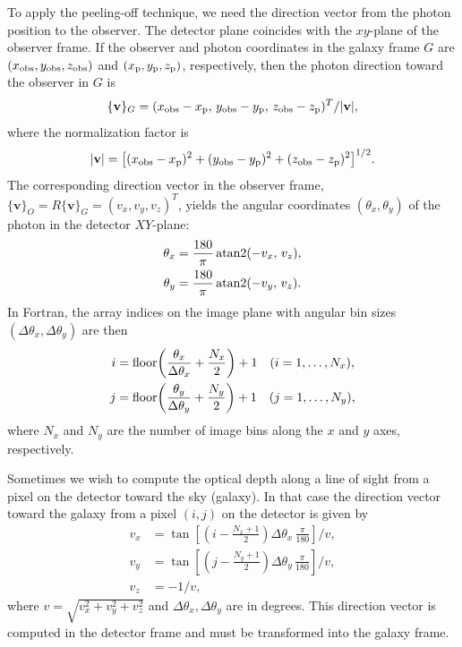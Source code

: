 \documentclass[english,a4paper]{kiseon_memo}
\begin{document}
To apply the peeling-off technique, we need the direction vector
from the photon position to the observer. The detector plane
coincides with the $xy$-plane of the observer frame. If the
observer and photon coordinates in the galaxy frame $G$ are
$(x_{\rm obs}, y_{\rm obs}, z_{\rm obs})$ and
$(x_{\rm p}, y_{\rm p}, z_{\rm p})$, respectively, then the photon
direction toward the observer in $G$ is
\[
\{\mathbf{v}\}_{G} =
  (x_{\rm obs}-x_{\rm p},\, y_{\rm obs}-y_{\rm p},\, z_{\rm obs}-z_{\rm p})^{T}/|\mathbf{v}|,
\]
where the normalization factor is
\[
|\mathbf{v}|=\bigl[(x_{\rm obs}-x_{\rm p})^{2}+(y_{\rm obs}-y_{\rm p})^{2}+(z_{\rm obs}-z_{\rm p})^{2}\bigr]^{1/2}.
\]
The corresponding direction vector in the observer frame,
$\{\mathbf{v}\}_{O}=R\{\mathbf{v}\}_{G}=(v_{x},v_{y},v_{z})^{T}$,
yields the angular coordinates $(\theta_{x},\theta_{y})$ of the
photon in the detector $XY$-plane:
\begin{align*}
\theta_{x} & = \frac{180}{\pi}\,{\rm atan2}(-v_{x},\,v_{z}),\\
\theta_{y} & = \frac{180}{\pi}\,{\rm atan2}(-v_{y},\,v_{z}).
\end{align*}
In Fortran, the array indices on the image plane with angular
bin sizes $(\Delta\theta_{x},\Delta\theta_{y})$ are then
\begin{align*}
i & = {\rm floor}\!\left(\frac{\theta_{x}}{\Delta\theta_{x}}+\frac{N_{x}}{2}\right)+1\quad (i=1,\ldots,N_{x}),\\
j & = {\rm floor}\!\left(\frac{\theta_{y}}{\Delta\theta_{y}}+\frac{N_{y}}{2}\right)+1\quad (j=1,\ldots,N_{y}),
\end{align*}
where $N_{x}$ and $N_{y}$ are the number of image bins along the
$x$ and $y$ axes, respectively.

Sometimes we wish to compute the optical depth along a line of
sight from a pixel on the detector toward the sky (galaxy). In
that case the direction vector toward the galaxy from a pixel
$(i,j)$ on the detector is given by
\begin{align*}
v_{x} & = \tan\!\left[\left(i-\tfrac{N_{x}+1}{2}\right)\Delta\theta_{x}\,\tfrac{\pi}{180}\right]\big/v,\\
v_{y} & = \tan\!\left[\left(j-\tfrac{N_{y}+1}{2}\right)\Delta\theta_{y}\,\tfrac{\pi}{180}\right]\big/v,\\
v_{z} & = -1/v,
\end{align*}
where $v=\sqrt{v_{x}^{2}+v_{y}^{2}+v_{z}^{2}}$ and
$\Delta\theta_{x},\Delta\theta_{y}$ are in degrees. This direction
vector is computed in the detector frame and must be transformed
into the galaxy frame.
\end{document}
